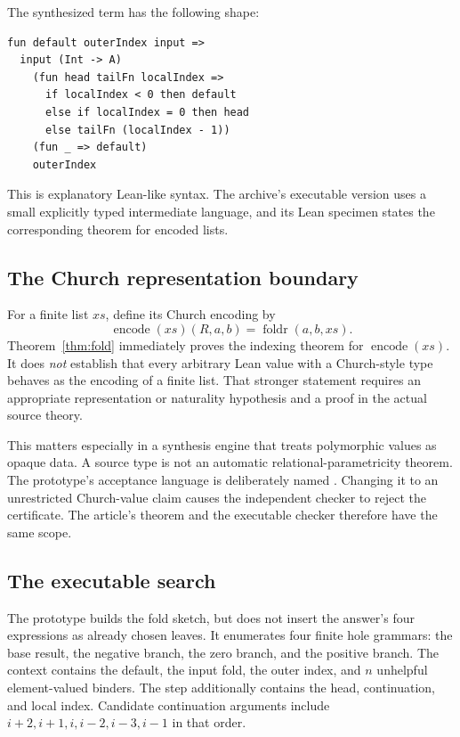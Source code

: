 The synthesized term has the following shape:
\begin{lstlisting}
fun default outerIndex input =>
  input (Int -> A)
    (fun head tailFn localIndex =>
      if localIndex < 0 then default
      else if localIndex = 0 then head
      else tailFn (localIndex - 1))
    (fun _ => default)
    outerIndex
\end{lstlisting}
This is explanatory Lean-like syntax. The archive's executable version uses a
small explicitly typed intermediate language, and its Lean specimen states the
corresponding theorem for encoded lists.

\subsection{The Church representation boundary}

For a finite list $xs$, define its Church encoding by
\[
 \operatorname{encode}(xs)(R,a,b)=\operatorname{foldr}(a,b,xs).
\]
Theorem~\ref{thm:fold} immediately proves the indexing theorem for
$\operatorname{encode}(xs)$. It does \emph{not} establish that every arbitrary
Lean value with a Church-style type behaves as the encoding of a finite list.
That stronger statement requires an appropriate representation or naturality
hypothesis and a proof in the actual source theory.

This matters especially in a synthesis engine that treats polymorphic values as
opaque data. A source type is not an automatic relational-parametricity theorem.
The prototype's acceptance language is deliberately named
. Changing it to an unrestricted
Church-value claim causes the independent checker to reject the certificate.
The article's theorem and the executable checker therefore have the same scope.

\subsection{The executable search}

The prototype builds the fold sketch, but does not insert the answer's four
expressions as already chosen leaves. It enumerates four finite hole grammars:
the base result, the negative branch, the zero branch, and the positive branch.
The context contains the default, the input fold, the outer index, and $n$
unhelpful element-valued binders. The step additionally contains the head,
continuation, and local index. Candidate continuation arguments include
$i+2,i+1,i,i-2,i-3,i-1$ in that order.

